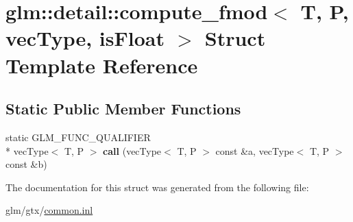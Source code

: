 \hypertarget{structglm_1_1detail_1_1compute__fmod}{\section{glm\-:\-:detail\-:\-:compute\-\_\-fmod$<$ T, P, vec\-Type, is\-Float $>$ Struct Template Reference}
\label{structglm_1_1detail_1_1compute__fmod}
}
\subsection*{Static Public Member Functions}
\begin{DoxyCompactItemize}
\item 
\hypertarget{structglm_1_1detail_1_1compute__fmod_add2143b71c7bfb64b030b4eed6ea3ef6}{static G\-L\-M\-\_\-\-F\-U\-N\-C\-\_\-\-Q\-U\-A\-L\-I\-F\-I\-E\-R \\*
vec\-Type$<$ T, P $>$ {\bfseries call} (vec\-Type$<$ T, P $>$ const \&a, vec\-Type$<$ T, P $>$ const \&b)}\label{structglm_1_1detail_1_1compute__fmod_add2143b71c7bfb64b030b4eed6ea3ef6}

\end{DoxyCompactItemize}


The documentation for this struct was generated from the following file\-:\begin{DoxyCompactItemize}
\item 
glm/gtx/\hyperlink{common_8inl}{common.\-inl}\end{DoxyCompactItemize}
